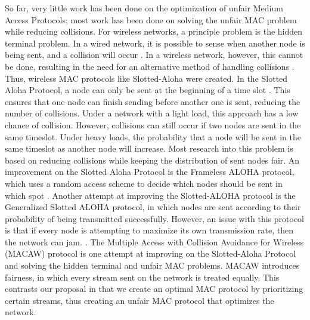 \documentclass{sigcomm-alternate}
\begin{document}
So far, very little work has been done on the optimization of unfair Medium Access Protocols; most work has been done on solving the unfair MAC problem while reducing collisions. For wireless networks, a principle problem is the hidden terminal problem. In a wired network, it is possible to sense when another node is being sent, and a collision will occur \cite{869217}. In a wireless network, however, this cannot be done, resulting in the need for an alternative method of handling collisions \cite{6574961}. Thus, wireless MAC protocols like Slotted-Aloha were created.  In the Slotted Aloha Protocol, a node can only be sent at the beginning of a time slot \cite{5340799}. This ensures that one node can finish sending before another one is sent, reducing the number of collisions.  Under a network with a light load, this approach has a low chance of collision. However, collisions can still occur if two nodes are sent in the same timeslot. Under heavy loads, the probability that a node will be sent in the same timeslot as another node will increase. Most research into this problem is based on reducing collisions while keeping the distribution of sent nodes fair.  An improvement on the Slotted Aloha Protocol is the Frameless ALOHA protocol, which uses a random access scheme to decide which nodes should be sent in which spot \cite{6336861}. Another attempt at improving the Slotted-ALOHA protocol is the Generalized Slotted ALOHA protocol, in which nodes are sent according to their probability of being transmitted successfully. However, an issue with this protocol is that if every node is attempting to maximize its own transmission rate, then the network can jam. \cite{4548143 }.  The Multiple Access with Collision Avoidance for Wireless (MACAW) protocol is one attempt at improving on the Slotted-Aloha Protocol and solving the hidden terminal and unfair MAC problems. MACAW introduces fairness, in which every stream sent on the network is treated equally. This contrasts our proposal in that we create an optimal MAC protocol by prioritizing certain streams, thus creating an unfair MAC protocol that optimizes the network.
\end{document}
